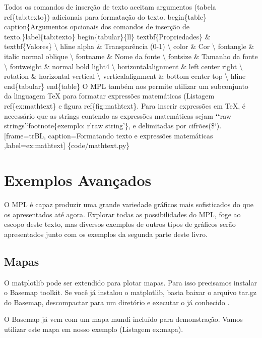 \documentclass[a4paper,10pt,brazil]{sphinxmanual}
\begin{document}
Todos os comandos de inserção de texto aceitam argumentos (tabela ref\{tab:texto\}) adicionais para formatação do texto.
begin\{table\}
caption\{Argumentos opcionais dos comandos de inserção de texto.\}label\{tab:texto\}
begin\{tabular\}\{l\textbar{}l\}
textbf\{Propriedades\} \& textbf\{Valores\} \textbackslash{}
hline
alpha \& Transparência (0-1) \textbackslash{}
color \& Cor \textbackslash{}
fontangle \& italic \textbar{} normal \textbar{} oblique \textbackslash{}
fontname \& Nome da fonte \textbackslash{}
fontsize \& Tamanho da fonte \textbackslash{}
fontweight \& normal \textbar{} bold \textbar{} light4 \textbackslash{}
horizontalalignment \& left \textbar{} center \textbar{} right \textbackslash{}
rotation \& horizontal \textbar{} vertical \textbackslash{}
verticalalignment \& bottom \textbar{} center \textbar{} top \textbackslash{}
hline
end\{tabular\}
end\{table\}
O MPL também nos permite utilizar um subconjunto da linguagem TeX  para formatar expressões matemáticas (Listagem ref\{ex:mathtext\} e figura ref\{fig:mathtext\}. Para inserir expressões em TeX, é necessário que as strings contendo as expressões matemáticas sejam {\color{red}\bfseries{}{}`{}`}raw strings'`footnote\{exemplo: r'raw string'\}, e delimitadas por cifrões(\${}`).
{[}frame=trBL, caption=Formatando texto e expressões matemáticas ,label=ex:mathtext{]} \{code/mathtext.py\}


\chapter{Exemplos Avançados}
\label{Capplot:exemplos-avancados}
O MPL é capaz produzir uma grande variedade gráficos mais
sofisticados do que os apresentados até agora. Explorar todas as
possibilidades do MPL, foge ao escopo deste texto, mas diversos
exemplos de outros tipos de gráficos serão apresentados junto com
os exemplos da segunda parte deste livro.


\section{Mapas}
\label{Capplot:mapas}
O matplotlib pode ser extendido para plotar mapas. Para isso
precisamos instalar o Basemap toolkit. Se você já instalou o
matplotlib, basta baixar o arquivo tar.gz do Basemap, descompactar
para um diretório e executar o já conhecido
.

O Basemap já vem com um mapa mundi incluído para demonstração.
Vamos utilizar este mapa em nosso exemplo (Listagem ex:mapa).
\end{document}

